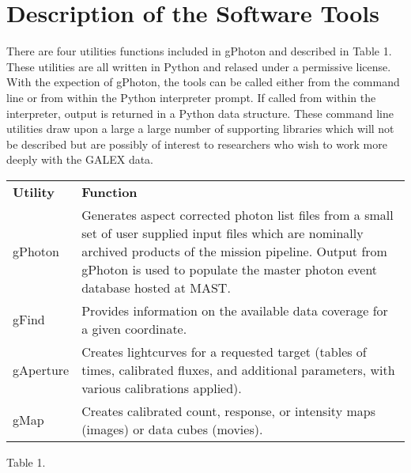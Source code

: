 \documentclass[preprint]{aastex}
\begin{document}
\section{Description of the Software Tools}
\label{softwaretools}
There are four utilities functions included in gPhoton and described in {\color{red}Table 1}. These utilities are all written in Python and relased under a permissive license. With the expection of gPhoton, the tools can be called either from the command line or from within the Python interpreter prompt. If called from within the interpreter, output is returned in a Python data structure. These command line utilities draw upon a large a large number of supporting libraries which will not be described but are possibly of interest to researchers who wish to work more deeply with the GALEX data.

\begin{tabular}{|p{2cm}|p{12cm}|}
\hline
	{\bf Utility} & {\bf Function}\\
	gPhoton & {Generates aspect corrected photon list files from a small set of user supplied input files which are nominally archived products of the mission pipeline. Output from gPhoton is used to populate the master photon event database hosted at MAST.}\\
	gFind & Provides information on the available data coverage for a given coordinate.\\
	gAperture & Creates lightcurves for a requested target (tables of times, calibrated fluxes, and additional parameters, with various calibrations applied).\\
	gMap & Creates calibrated count, response, or intensity maps (images) or data cubes (movies).\\
\hline
\end{tabular}

{\color{red}Table 1.}
\end{document}
